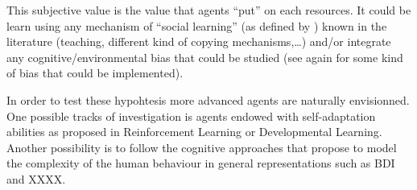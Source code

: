 \documentclass{wscpaperproc}
\begin{document}
This subjective value is the value that agents ``put'' on each resources. It could be learn using any mechanism of ``social learning'' (as defined by \cite{lycett_cultural_2015}) known in the literature (teaching, different kind of copying mechanisms,\ldots) and/or integrate any cognitive/environmental bias that could be studied (see again \cite{lycett_cultural_2015} for some kind of bias that could be implemented).

In order to test these hypohtesis more advanced agents are naturally envisionned. One possible tracks of investigation is agents endowed with self-adaptation abilities as proposed in Reinforcement Learning or Developmental Learning. Another possibility is to follow the cognitive approaches that propose to model the complexity of the human behaviour in general representations such as BDI and XXXX.



  
\end{document}
